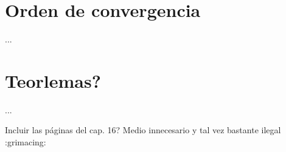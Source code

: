 \documentclass[12pt]{extarticle}
\newenvironment{comentarios_meta}
    {\begin{framed}\noindent\textcolor{red}{\textbf{//}}}
    {\end{framed}}
\begin{document}
\section{Orden de convergencia}

    ...
    

\section{Teorlemas?}

    ...




% 
% 


\begin{comentarios_meta}
    Incluir las páginas del cap. 16? Medio innecesario y tal vez bastante ilegal :grimacing:
\end{comentarios_meta}
\end{document}
